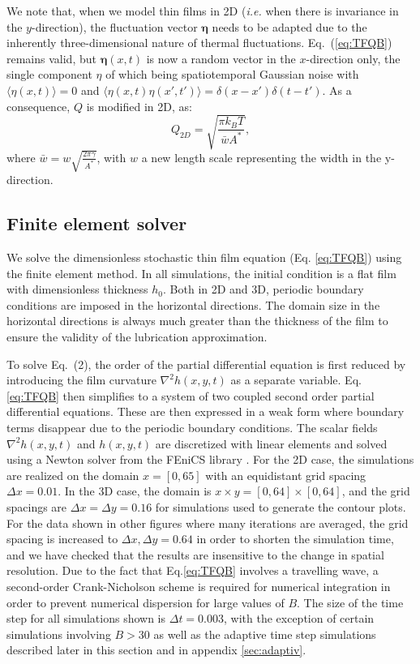 \documentclass[
 onecolumn,
 amsmath,amssymb,
floatfix,superscriptaddress
]{revtex4-2}
\begin{document}
We note that, when we model thin films in 2D (\textit{i.e.} when there is invariance in the $y$-direction), the fluctuation vector $\boldsymbol{\eta}$ needs to be adapted due to the inherently three-dimensional nature of thermal fluctuations. Eq.~(\ref{eq:TFQB}) remains valid, but $\boldsymbol{\eta}(x,t)$ is now a random vector in the $x$-direction only, the single  component $\eta$ of which being spatiotemporal Gaussian noise with $\langle\eta(x,t)\rangle=0$ and $\langle\eta(x,t)\eta(x',t')\rangle=\delta(x-x')\delta(t-t')$. As a consequence, $Q$ is modified in 2D, as:
\begin{equation}
Q_{2D}=\sqrt{\frac{\pi k_B T}{\bar{w}A^*}},
\end{equation}
where $\bar{w}=w\sqrt{\frac{2\pi \gamma}{A^*}}$, with $w$ a new length scale representing the width in the y-direction. 

\subsection{\label{sec:Numerics}Finite element solver}

We solve the dimensionless stochastic thin film equation (Eq. \eqref{eq:TFQB}) using the finite element method. In all simulations, the initial condition is a  flat film with dimensionless thickness $h_0$. Both in 2D and 3D, periodic boundary conditions are imposed in the horizontal directions. The domain size in the horizontal directions is always much greater than the thickness of the film to ensure the validity of the lubrication approximation.

To solve Eq.~(2), the order of the partial differential equation is first reduced by introducing the film curvature $\nabla ^2 h(x,y,t)$ as a separate variable. Eq. \eqref{eq:TFQB} then simplifies to a system of two coupled second order partial differential equations. These are then expressed in a weak  form where boundary terms disappear due to the periodic boundary conditions. The scalar fields $\nabla ^2 h(x,y,t)$ and $h(x,y,t)$ are discretized with linear elements and solved using a Newton solver from the FEniCS library \cite{LoggMardalEtAl2012}. For the 2D case, the simulations are realized on the domain $x=[0,65]$ with an equidistant grid spacing $\Delta x = 0.01$. In the 3D case, the domain is $x\times y=[0,64]\times [0,64]$, and the grid spacings are $\Delta x = \Delta y = 0.16$ for simulations used to generate the contour plots. For the data shown in other figures where many iterations are averaged, the grid spacing is increased to $\Delta x, \Delta y = 0.64$ in order to shorten the simulation time, and we have checked that the results are insensitive to the change in spatial resolution. Due to the fact that Eq.\eqref{eq:TFQB} involves a travelling wave, a second-order Crank-Nicholson scheme is required for numerical integration in order to prevent numerical dispersion for large values of $B$. The  size of the time step for all simulations shown is $\Delta t = 0.003$, with the exception of certain simulations involving $B>30$ as well as the adaptive time step simulations described later in this section and in appendix \ref{sec:adaptiv}. 
\end{document}
